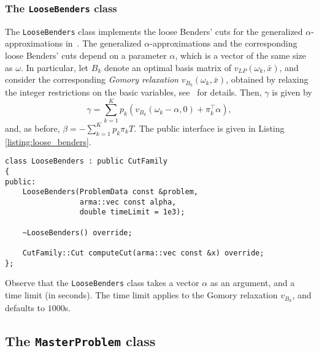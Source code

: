 \documentclass[12pt, english]{article}
\begin{document}
\subsubsection{The \texttt{LooseBenders} class}
\label{subsubsec:loose_benders}

The \texttt{LooseBenders} class implements the loose Benders' cuts for the generalized $\alpha$-approximations in~\cite{vanderLaan2020}.
The generalized $\alpha$-approximations and the corresponding loose Benders' cuts depend on a parameter $\alpha$, which is a vector of the same size as $\omega$.
In particular, let $B_k$ denote an optimal basis matrix of $v_{LP}(\omega_k, \bar x)$, and consider the corresponding \emph{Gomory relaxation} $v_{B_k}(\omega_k, \bar x)$, obtained by relaxing the integer restrictions on the basic variables, see~\cite{vanderLaan2020} for details.
Then, $\gamma$ is given by 
\[\gamma = \sum_{k = 1}^K p_k\left(v_{B_k}(\omega_k - \alpha, 0) + \pi_k^\top\alpha \right),\]
and, as before, $\beta = -\sum_{k = 1}^K p_k \pi_k T$. The public interface is given in Listing \ref{listing:loose_benders}.
\begin{lstlisting}[caption={Public interface of the \texttt{LooseBenders} class.}, 
                   label={listing:loose_benders}]
class LooseBenders : public CutFamily
{
public:
	LooseBenders(ProblemData const &problem,
			 	 arma::vec const alpha,
			 	 double timeLimit = 1e3);
	
	~LooseBenders() override;
	
	CutFamily::Cut computeCut(arma::vec const &x) override;
};
\end{lstlisting}
Observe that the \texttt{LooseBenders} class takes a vector $\alpha$ as an argument, and a time limit (in seconds). The time limit applies to the Gomory relaxation $v_{B_k}$, and defaults to $1000$s.

\subsection{The \texttt{MasterProblem} class}
\label{subsec:master_problem_class}
\end{document}
